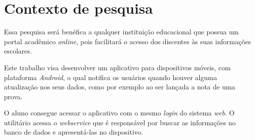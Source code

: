 \section{Contexto de pesquisa}

	\par Essa pesquisa será benéfica a qualquer instituição educacional que possua
um portal acadêmico \textit{online}, pois facilitará o acesso dos discentes às suas
informações escolares.

	\par Este trabalho visa desenvolver um aplicativo para dispositivos móveis, 
com plataforma \textit{Android}, o qual notifica os usuários quando houver alguma
atualização nos seus dados, como por exemplo ao ser lançada a nota de uma prova.
	
	\par O aluno consegue acessar o aplicativo com o mesmo \textit{login} do
sistema \textit{web}. O utilitário acessa o \textit{webservice} que é
responsável por buscar as informações no banco de dados e apresentá-las no
dispositivo.